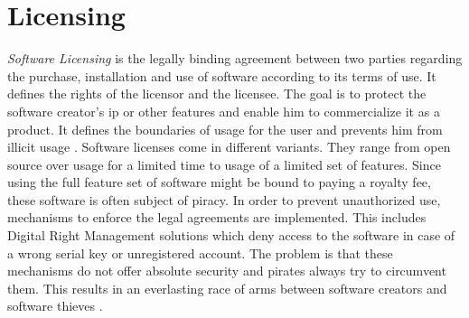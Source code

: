 \section{Licensing} \label{subsection:introduction-licensing}
\textit{Software Licensing} is the legally binding agreement between two parties regarding the purchase, installation and use of software according to its terms of use.
It defines the rights of the licensor and the licensee.
The goal is to protect the software creator's \gls{ip} or other features and enable him to commercialize it as a product.
It defines the boundaries of usage for the user and prevents him from illicit usage \cite{uncgLicensing}.
\newline
Software licenses come in different variants.
They range from open source over usage for a limited time to usage of a limited set of features.
Since using the full feature set of software might be bound to paying a royalty fee, these software is often subject of piracy.
In order to prevent unauthorized use, mechanisms to enforce the legal agreements are implemented.
This includes Digital Right Management solutions which deny access to the software in case of a wrong serial key or unregistered account.
\newline
\newline
The problem is that these mechanisms do not offer absolute security and pirates always try to circumvent them.
This results in an everlasting race of arms between software creators and software thieves \cite{szCopy}.
